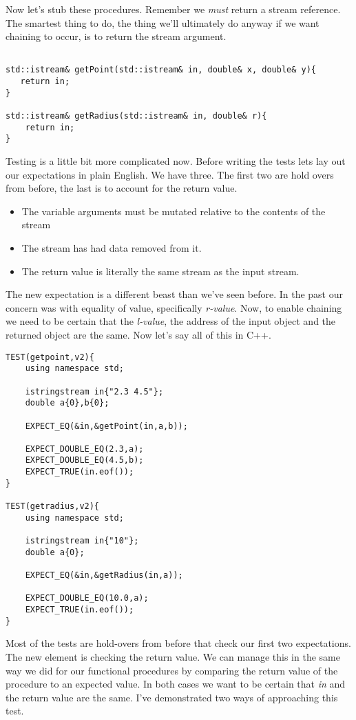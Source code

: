 \documentclass[nobib]{tufte-handout}
\begin{document}
Now let's stub these procedures. Remember we \textit{must} return a stream reference. The smartest thing to do, the thing we'll ultimately do anyway if we want chaining to occur, is to return the stream argument. 
\begin{verbatim}

std::istream& getPoint(std::istream& in, double& x, double& y){ 
   return in;
}

std::istream& getRadius(std::istream& in, double& r){
	return in;
}

\end{verbatim}

Testing is a little bit more complicated now. Before writing the tests lets lay out our expectations in plain English. We have three. The first two are hold overs from before, the last is to account for the return value.
\begin{itemize}
\item The variable arguments must be mutated relative to the contents of the stream
\item The stream has had data removed from it.
\item The return value is literally the same stream as the input stream.
\end{itemize}
The new expectation is a different beast than we've seen before. In the past our concern was with equality of value, specifically \textit{r-value}. Now, to enable chaining we need to be certain that the \textit{l-value}, the address of the input object and the returned object are the same. Now let's say all of this in C++.
\begin{verbatim}
TEST(getpoint,v2){
    using namespace std;

    istringstream in{"2.3 4.5"};
    double a{0},b{0};

    EXPECT_EQ(&in,&getPoint(in,a,b));

    EXPECT_DOUBLE_EQ(2.3,a);
    EXPECT_DOUBLE_EQ(4.5,b);
    EXPECT_TRUE(in.eof());
}

TEST(getradius,v2){
    using namespace std;

    istringstream in{"10"};
    double a{0};

    EXPECT_EQ(&in,&getRadius(in,a));

    EXPECT_DOUBLE_EQ(10.0,a);
    EXPECT_TRUE(in.eof());
}
\end{verbatim}
Most of the tests are hold-overs from before that check our first two expectations. The new element is checking the return value.  We can manage this in the same way we did for our functional procedures by comparing the return value of the procedure to an expected value. In both cases we want to be certain
that \textit{in} and the return value are the same. I've demonstrated two ways of approaching this test.  
\end{document}
